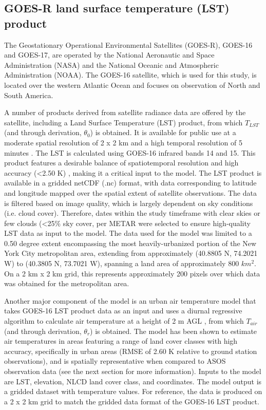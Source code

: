 \FloatBarrier

\subsection{GOES-R land surface temperature (LST) product} \label{LST}
The Geostationary Operational Environmental Satellites (GOES-R), GOES-16 and GOES-17, are operated by the National Aeronautic and Space Administration (NASA) and the National Oceanic and Atmospheric Administration (NOAA). The GOES-16 satellite, which is used for this study, is located over the western Atlantic Ocean and focuses on observation of North and South America.

A number of products derived from satellite radiance data are offered by the satellite, including a Land Surface Temperature (LST) product,  from which $T_{LST}$ (and through derivation, $\theta_0$) is obtained. It is available for public use at a  moderate spatial resolution of 2 x 2 km and a high temporal resolution of 5 minutes \citep{Yu_2016}. The LST is calculated using GOES-16 infrared bands 14 and 15. This product features a desirable balance of spatiotemporal resolution and high accuracy (\textless 2.50 K) \citep{Valenti_2017}, making it a critical input to the model. The LST product is available in a gridded netCDF (.nc) format, with data corresponding to latitude and longitude mapped over the spatial extent of satellite observations. The data is filtered based on image quality, which is largely dependent on sky conditions (i.e. cloud cover). Therefore, dates within the study timeframe with clear skies or few clouds (\textless 25$\%$ sky cover, per METAR \citep{WMO_2008} were selected to ensure high-quality LST data as input to the model. The data used for the model was limited to a 0.50 degree extent encompassing the most heavily-urbanized portion of the New York City metropolitan area, extending from approximately (40.8805 N, 74.2021 W) to (40.3805 N, 73.7021 W), spanning a land area of approximately 800 $km^2$. On a 2 km x 2 km grid, this represents approximately 200 pixels over which data was obtained for the metropolitan area.

Another major component of the model is an urban air temperature model that takes GOES-16 LST product data as an input and uses a diurnal regressive algorithm to calculate air temperature at a height of 2 m AGL \citep{Hrisko_2020},  from which $T_{air}$ (and through derivation, $\theta_r$) is obtained. The model has been shown to estimate air temperatures in areas featuring a range of land cover classes with high accuracy, specifically in urban areas (RMSE of 2.60 K relative to ground station observations),  and is spatially representative when compared to ASOS observation data (see the next section for more information). Inputs to the model are LST, elevation, NLCD land cover class, and coordinates. The model output is a gridded dataset with temperature values. For reference, the data is produced on a 2 x 2 km grid to match the gridded data format of the GOES-16 LST product. 


